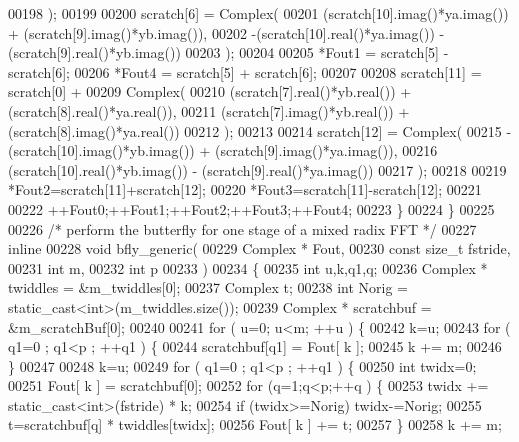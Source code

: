 \begin{DoxyCode}
00198             );
00199 
00200         scratch[6] = Complex(
00201             (scratch[10].imag()*ya.imag()) + (scratch[9].imag()*yb.imag()),
00202             -(scratch[10].real()*ya.imag()) - (scratch[9].real()*yb.imag())
00203             );
00204 
00205         *Fout1 = scratch[5] - scratch[6];
00206         *Fout4 = scratch[5] + scratch[6];
00207 
00208         scratch[11] = scratch[0] +
00209           Complex(
00210               (scratch[7].real()*yb.real()) + (scratch[8].real()*ya.real()),
00211               (scratch[7].imag()*yb.real()) + (scratch[8].imag()*ya.real())
00212               );
00213 
00214         scratch[12] = Complex(
00215             -(scratch[10].imag()*yb.imag()) + (scratch[9].imag()*ya.imag()),
00216             (scratch[10].real()*yb.imag()) - (scratch[9].real()*ya.imag())
00217             );
00218 
00219         *Fout2=scratch[11]+scratch[12];
00220         *Fout3=scratch[11]-scratch[12];
00221 
00222         ++Fout0;++Fout1;++Fout2;++Fout3;++Fout4;
00223       \}
00224     \}
00225 
00226   \textcolor{comment}{/* perform the butterfly for one stage of a mixed radix FFT */}
00227   \textcolor{keyword}{inline}
00228     \textcolor{keywordtype}{void} bfly\_generic(
00229         Complex * Fout,
00230         \textcolor{keyword}{const} \textcolor{keywordtype}{size\_t} fstride,
00231         \textcolor{keywordtype}{int} m,
00232         \textcolor{keywordtype}{int} p
00233         )
00234     \{
00235       \textcolor{keywordtype}{int} u,k,q1,q;
00236       Complex * twiddles = &m\_twiddles[0];
00237       Complex t;
00238       \textcolor{keywordtype}{int} Norig = \textcolor{keyword}{static\_cast<}\textcolor{keywordtype}{int}\textcolor{keyword}{>}(m\_twiddles.size());
00239       Complex * scratchbuf = &m\_scratchBuf[0];
00240 
00241       \textcolor{keywordflow}{for} ( u=0; u<m; ++u ) \{
00242         k=u;
00243         \textcolor{keywordflow}{for} ( q1=0 ; q1<p ; ++q1 ) \{
00244           scratchbuf[q1] = Fout[ k  ];
00245           k += m;
00246         \}
00247 
00248         k=u;
00249         \textcolor{keywordflow}{for} ( q1=0 ; q1<p ; ++q1 ) \{
00250           \textcolor{keywordtype}{int} twidx=0;
00251           Fout[ k ] = scratchbuf[0];
00252           \textcolor{keywordflow}{for} (q=1;q<p;++q ) \{
00253             twidx += \textcolor{keyword}{static\_cast<}\textcolor{keywordtype}{int}\textcolor{keyword}{>}(fstride) * k;
00254             \textcolor{keywordflow}{if} (twidx>=Norig) twidx-=Norig;
00255             t=scratchbuf[q] * twiddles[twidx];
00256             Fout[ k ] += t;
00257           \}
00258           k += m;

\end{DoxyCode}
